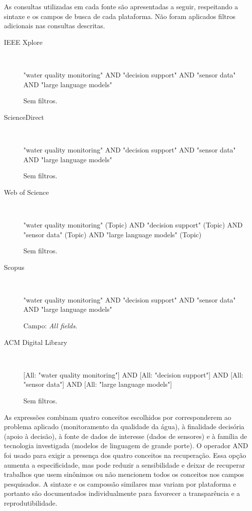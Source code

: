 As consultas utilizadas em cada fonte são apresentadas a seguir,
respeitando a sintaxe e os campos de busca de cada plataforma. Não foram
aplicados filtros adicionais nas consultas descritas.

\begin{description}
    \item[IEEE Xplore]\mbox{}\\
    {\small\ttfamily\raggedright
    "water quality monitoring" AND "decision support" AND "sensor data" AND "large language models"\par}
    Sem filtros.

    \item[ScienceDirect]\mbox{}\\
    {\small\ttfamily\raggedright
    "water quality monitoring" AND "decision support" AND "sensor data" AND "large language models"\par}
    Sem filtros.

    \item[Web of Science]\mbox{}\\
    {\small\ttfamily\raggedright
    "water quality monitoring" (Topic) AND "decision support" (Topic) AND "sensor data" (Topic) AND "large language models" (Topic)\par}
    Sem filtros.

    \item[Scopus]\mbox{}\\
    {\small\ttfamily\raggedright
    "water quality monitoring" AND "decision support" AND "sensor data" AND "large language models"\par}
    Campo: \textit{All fields}.

    \item[ACM Digital Library]\mbox{}\\
    {\small\ttfamily\raggedright
    [All: "water quality monitoring"] AND [All: "decision support"] AND [All: "sensor data"] AND [All: "large language models"]\par}
    Sem filtros.
\end{description}

As expressões combinam quatro conceitos escolhidos por corresponderem ao
problema aplicado (monitoramento da qualidade da água), à finalidade decisória
(apoio à decisão), à fonte de dados de interesse (dados de sensores) e à família
de tecnologia investigada (modelos de linguagem de grande porte). O operador
AND foi usado para exigir a presença dos quatro conceitos na recuperação. Essa
opção aumenta a especificidade, mas pode reduzir a sensibilidade e deixar de
recuperar trabalhos que usem sinônimos ou não mencionem todos os conceitos nos
campos pesquisados. A sintaxe e os campossão similares mas variam por
plataforma e portanto são documentados individualmente para favorecer a transparência e
a reprodutibilidade.
